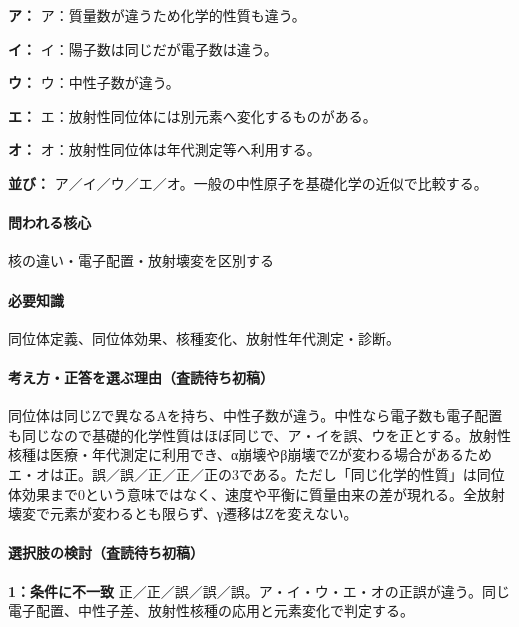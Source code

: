 \noindent\textbf{ア：} ア：質量数が違うため化学的性質も違う。\par

\noindent\textbf{イ：} イ：陽子数は同じだが電子数は違う。\par

\noindent\textbf{ウ：} ウ：中性子数が違う。\par

\noindent\textbf{エ：} エ：放射性同位体には別元素へ変化するものがある。\par

\noindent\textbf{オ：} オ：放射性同位体は年代測定等へ利用する。\par

\noindent\textbf{並び：} ア／イ／ウ／エ／オ。一般の中性原子を基礎化学の近似で比較する。\par

\paragraph{問われる核心} 核の違い・電子配置・放射壊変を区別する

\paragraph{必要知識} 同位体定義、同位体効果、核種変化、放射性年代測定・診断。

\paragraph{考え方・正答を選ぶ理由（査読待ち初稿）} 同位体は同じZで異なるAを持ち、中性子数が違う。中性なら電子数も電子配置も同じなので基礎的化学性質はほぼ同じで、ア・イを誤、ウを正とする。放射性核種は医療・年代測定に利用でき、α崩壊やβ崩壊でZが変わる場合があるためエ・オは正。誤／誤／正／正／正の3である。ただし「同じ化学的性質」は同位体効果まで0という意味ではなく、速度や平衡に質量由来の差が現れる。全放射壊変で元素が変わるとも限らず、γ遷移はZを変えない。

\paragraph{選択肢の検討（査読待ち初稿）}\mbox{}\par

\noindent\textbf{1：条件に不一致} 正／正／誤／誤／誤。ア・イ・ウ・エ・オの正誤が違う。同じ電子配置、中性子差、放射性核種の応用と元素変化で判定する。\par

